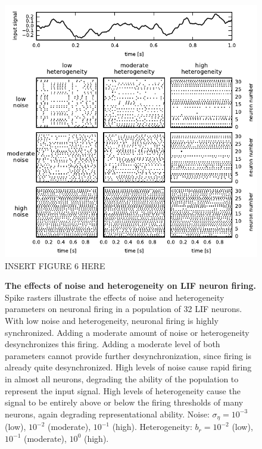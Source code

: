 \documentclass[letterpaper,11pt]{article}
\begin{document}
\begin{figure}
  \ifx\hidefigures\undefined
    \centering
    \includegraphics[width=\textwidth]{figure6_syncraster.pdf}
  \else
    INSERT FIGURE 6 HERE
  \fi
  \caption{
    \textbf{The effects of noise and heterogeneity on LIF neuron firing.}
    Spike rasters illustrate the effects of noise and heterogeneity parameters on neuronal firing in a population of 32 LIF neurons. With low noise and heterogeneity, neuronal firing is highly synchronized. Adding a moderate amount of noise or heterogeneity desynchronizes this firing. Adding a moderate level of both parameters cannot provide further desynchronization, since firing is already quite desynchronized. High levels of noise cause rapid firing in almost all neurons, degrading the ability of the population to represent the input signal. High levels of heterogeneity cause the signal to be entirely above or below the firing thresholds of many neurons, again degrading representational ability. Noise: $\sigma_\eta = $$10^{-3}$ (low), $10^{-2}$ (moderate), $10^{-1}$ (high). Heterogeneity: $b_r = $$10^{-2}$ (low), $10^{-1}$ (moderate), $10^{0}$ (high).
  }
  \label{fig:syncraster}
\end{figure}
\end{document}
